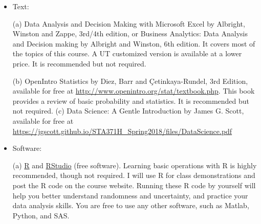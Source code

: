 \documentclass[11pt]{article}
\begin{document}
\begin{itemize}
\item Text:  


(a) Data Analysis and Decision Making with Microsoft Excel by Albright, Winston and Zappe, 3rd/4th edition, or Business Analytics: Data Analysis and Decision making by Albright and Winston, 6th edition. It covers most of the topics  of this course. A UT customized version is available at a lower price.       It is recommended but not required. 

(b) OpenIntro Statistics by Diez, Barr and \c{C}etinkaya-Rundel, 3rd Edition, available for free at \href{https://www.openintro.org/stat/textbook.php?stat_book=os}{\textcolor[rgb]{0.00,0.00,1.00}{http://www.openintro.org/stat/textbook.php}}. %
This book provides a
 review of basic probability and statistics.  It is recommended but not required.
(c) Data Science: A Gentle Introduction by James G. Scott, available for free at \href{https://jgscott.github.io/STA371H_Spring2018/files/DataScience.pdf}{\textcolor[rgb]{0.00,0.00,1.00}{https://jgscott.github.io/STA371H\_Spring2018/files/DataScience.pdf}}


	
	
\item Software:  

(a) 
 \href{https://cran.rstudio.com/}{\textcolor[rgb]{0.00,0.00,1.00}{
R}} and  \href{https://www.rstudio.com/products/rstudio/download/}{\textcolor[rgb]{0.00,0.00,1.00}{
RStudio}}  (free software). Learning basic operations with R is highly recommended, though not required. I will use R for class demonstrations and post the R code on the course website.  Running these R code by yourself will help you better understand randomness and uncertainty, and practice your data analysis skills. %
You are free to use any other software, such as Matlab, Python, and SAS. %
		

\end{itemize}
\end{document}
